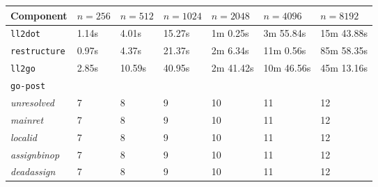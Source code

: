 \begin{table}[htbp]
	\begin{center}
		\begin{tabular}{|l|l|l|l|l|l|l|}
			\hline
			Component & $ n = 256 $ & $ n = 512 $ & $ n = 1024 $ & $ n = 2048 $ & $ n = 4096 $ & $ n = 8192 $ \\
			\hline
			\rowcolor{light_green_3}
			\texttt{ll2dot} & 1.14s & 4.01s & 15.27s & 1m 0.25s & 3m 55.84s & 15m 43.88s \\
			\rowcolor{light_green_3}
			\texttt{restructure} & 0.97s & 4.37s & 21.37s & 2m 6.34s & 11m 0.56s & 85m 58.35s \\
			\rowcolor{light_green_3}
			\texttt{ll2go} & 2.85s & 10.59s & 40.95s & 2m 41.42s & 10m 46.56s & 45m 13.16s \\
			\hline
			\multicolumn{7}{|l|}{\texttt{go-post}} \\
			\hline
			\rowcolor{light_green_3}
			\textit{unresolved} & 7 & 8 & 9 & 10 & 11 & 12 \\
			\rowcolor{light_green_3}
			\textit{mainret} & 7 & 8 & 9 & 10 & 11 & 12 \\
			\rowcolor{light_red_3}
			\textit{localid} & 7 & 8 & 9 & 10 & 11 & 12 \\
			\rowcolor{light_green_3}
			\textit{assignbinop} & 7 & 8 & 9 & 10 & 11 & 12 \\
			\rowcolor{light_green_3}
			\textit{deadassign} & 7 & 8 & 9 & 10 & 11 & 12 \\

\end{tabular}
\end{center}
\end{table}
